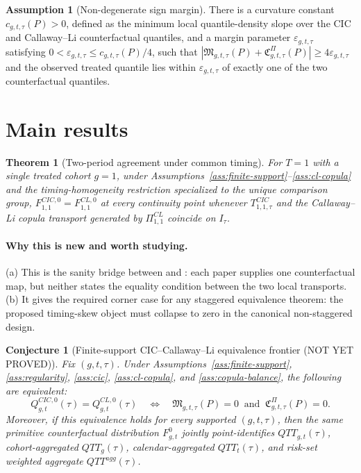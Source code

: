 \documentclass[11pt]{article}
\theoremstyle{definition}
\newtheorem{assumption}{Assumption}
\theoremstyle{plain}
\newtheorem{theorem}{Theorem}
\newtheorem{conjecture}{Conjecture}
\theoremstyle{remark}
\begin{document}
\begin{assumption}[Non-degenerate sign margin]\label{ass:margin}
There is a curvature constant \(c_{g,t,\tau}(P)>0\), defined as the minimum local quantile-density slope over the CIC and Callaway--Li counterfactual quantiles, and a margin parameter \(\varepsilon_{g,t,\tau}\) satisfying \(0<\varepsilon_{g,t,\tau}\leq c_{g,t,\tau}(P)/4\), such that \(|\mathfrak M_{g,t,\tau}(P)+\mathfrak C^{\Pi}_{g,t,\tau}(P)|\geq 4\varepsilon_{g,t,\tau}\) and the observed treated quantile lies within \(\varepsilon_{g,t,\tau}\) of exactly one of the two counterfactual quantiles.
\end{assumption}

\section{Main results}
\begin{theorem}[Two-period agreement under common timing]\label{thm:two-period}
For \(T=1\) with a single treated cohort \(g=1\), under Assumptions~\ref{ass:finite-support}--\ref{ass:cl-copula} and the timing-homogeneity restriction specialized to the unique comparison group, \(F^{CIC,0}_{1,1}=F^{CL,0}_{1,1}\) at every continuity point whenever \(T^{CIC}_{1,1,\tau}\) and the Callaway--Li copula transport generated by \(\Pi^{CL}_{1,1}\) coincide on \(I_\tau\).
\end{theorem}
\paragraph{Why this is new and worth studying.}
(a) This is the sanity bridge between \citet[Sections 2--3]{AtheyImbens2006} and \citet[Sections 2--3]{CallawayLi2019}: each paper supplies one counterfactual map, but neither states the equality condition between the two local transports. (b) It gives \citet{LiLin2024} the required corner case for any staggered equivalence theorem: the proposed timing-skew object must collapse to zero in the canonical non-staggered design.

\begin{conjecture}[Finite-support CIC--Callaway--Li equivalence frontier (NOT YET PROVED)]\label{conj:frontier}
Fix \((g,t,\tau)\). Under Assumptions~\ref{ass:finite-support}, \ref{ass:regularity}, \ref{ass:cic}, \ref{ass:cl-copula}, and \ref{ass:copula-balance}, the following are equivalent:
\[
Q^{CIC,0}_{g,t}(\tau)=Q^{CL,0}_{g,t}(\tau)
\quad\Longleftrightarrow\quad
\mathfrak M_{g,t,\tau}(P)=0\ \text{ and }\ \mathfrak C^{\Pi}_{g,t,\tau}(P)=0.
\]
Moreover, if this equivalence holds for every supported \((g,t,\tau)\), then the same primitive counterfactual distribution \(F^0_{g,t}\) jointly point-identifies \(QTT_{g,t}(\tau)\), cohort-aggregated \(QTT_g(\tau)\), calendar-aggregated \(QTT_t(\tau)\), and risk-set weighted aggregate \(QTT^{agg}(\tau)\).
\end{conjecture}
\end{document}
